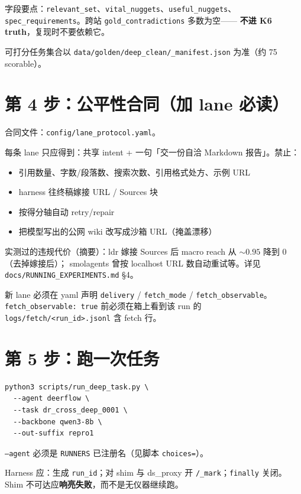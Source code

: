 \documentclass[10.5pt,a4paper]{article}
\begin{document}
字段要点：\texttt{relevant\_set}、\texttt{vital\_nuggets}、\texttt{useful\_nuggets}、
\texttt{spec\_requirements}。跨站 \texttt{gold\_contradictions} 多数为空——
\textbf{不进 K6 truth}，复现时不要依赖它。

可打分任务集合以 \texttt{data/golden/deep\_clean/\_manifest.json} 为准（约 75 scorable）。

\section{第 4 步：公平性合同（加 lane 必读）}

合同文件：\texttt{config/lane\_protocol.yaml}。

每条 lane 只应得到：共享 intent + 一句「交一份自洽 Markdown 报告」。禁止：
\begin{itemize}
  \item 引用数量、字数/段落数、搜索次数、引用格式处方、示例 URL
  \item harness 往终稿嫁接 URL / Sources 块
  \item 按得分轴自动 retry/repair
  \item 把模型写出的公网 wiki 改写成沙箱 URL（掩盖漂移）
\end{itemize}

实测过的违规代价（摘要）：ldr 嫁接 Sources 后 macro reach 从 $\sim0.95$ 降到 $0$（去掉嫁接后）；
smolagents 曾按 localhost URL 数自动重试等。详见 \texttt{docs/RUNNING\_EXPERIMENTS.md} §4。

新 lane 必须在 yaml 声明 \texttt{delivery} / \texttt{fetch\_mode} / \texttt{fetch\_observable}。
\texttt{fetch\_observable: true} 前必须在箱上看到该 run 的 \texttt{logs/fetch/<run\_id>.jsonl} 含 fetch 行。

\section{第 5 步：跑一次任务}

\begin{lstlisting}
python3 scripts/run_deep_task.py \
  --agent deerflow \
  --task dr_cross_deep_0001 \
  --backbone qwen3-8b \
  --out-suffix repro1
\end{lstlisting}

\texttt{--agent} 必须是 \texttt{RUNNERS} 已注册名（见脚本 \texttt{choices=}）。

Harness 应：生成 \texttt{run\_id}；对 shim 与 ds\_proxy 开 \texttt{/\_mark}；\texttt{finally} 关闭。
Shim 不可达应\textbf{响亮失败}，而不是无仪器继续跑。
\end{document}
